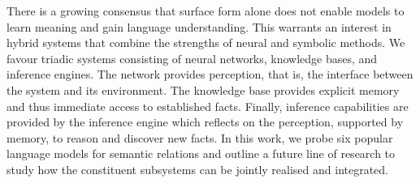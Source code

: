 There is a growing consensus that surface form alone does not enable models to learn meaning  and  gain  language  understanding.    This warrants  an  interest  in  hybrid  systems  that combine the strengths of neural and symbolic methods.   We favour triadic systems consisting of neural networks, knowledge bases, and inference engines.  The network provides perception, that is, the interface between the system and its environment. The knowledge base provides  explicit memory and  thus  immediate access to established facts.  Finally, inference capabilities are provided by the inference engine which reflects on the perception, supported by memory, to reason and discover new facts. In this work, we probe six popular language models for semantic relations and outline a future line of research to study how the constituent subsystems can be jointly realised and integrated.
